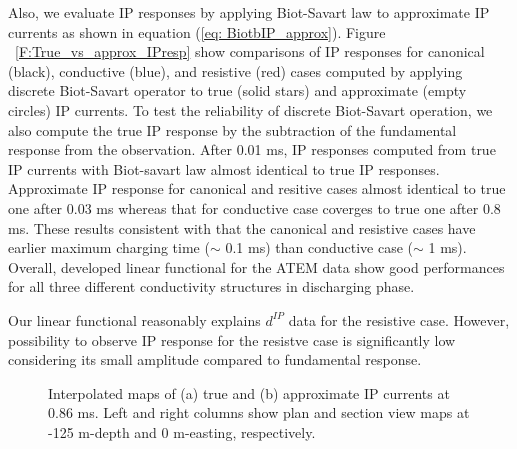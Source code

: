 \documentclass[extra,mreferee]{gji}
\newcommand{\dip}{d^{IP}}
\begin{document}
Also, we evaluate IP responses by applying Biot-Savart law to approximate IP currents as shown in equation (\ref{eq: BiotbIP_approx}). 
Figure ~\ref{F:True_vs_approx_IPresp} show comparisons of IP responses for canonical (black), conductive (blue), and resistive (red) cases computed by applying discrete Biot-Savart operator to true (solid stars) and approximate (empty circles) IP currents. 
To test the reliability of discrete Biot-Savart operation, we also compute the true IP response by the subtraction of the fundamental response from the observation.
After 0.01 ms, IP responses computed from true IP currents with Biot-savart law almost identical to true IP responses.
Approximate IP response for canonical and resitive cases almost identical to true one after 0.03 ms whereas that for conductive case coverges to true one after 0.8 ms. 
These results consistent with that the canonical and resistive cases have earlier maximum charging time ($\sim$ 0.1 ms) than conductive case ($\sim$ 1 ms).
Overall, developed linear functional for the ATEM data show good performances for all three different conductivity structures in discharging phase. 

Our linear functional reasonably explains $\dip$ data for the resistive case. However, possibility to observe IP response for the resistve case is significantly low considering its small amplitude compared to fundamental response. 

\begin{figure}
  \caption{Interpolated maps of (a) true and (b) approximate IP currents at 0.86 ms. Left and right columns show plan and section view maps at -125 m-depth and 0 m-easting, respectively. }
  \label{F:IPcurrent_PlanandSec_early}
\end{figure}
\end{document}
